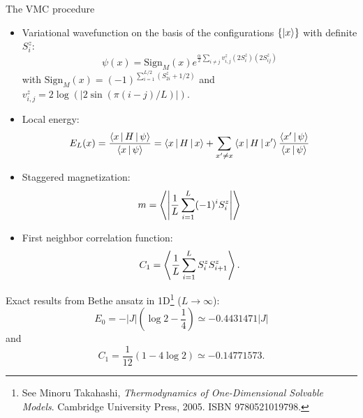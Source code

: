 \documentclass[10pt, compress, protectframetitle, handout]{beamer}
\begin{document}
\begin{frame}[allowframebreaks]{The VMC procedure}

	\begin{itemize}
		\item Variational wavefunction on the basis of the configurations $\{\Ket{x}\}$ with definite $S_{i}^{z}$:
		\begin{equation}
			\psi(x) = \text{Sign}_{M}(x)e^{\frac{\alpha}{2}\sum_{i \neq j}v_{i,j}^{z}(2S_{i}^{z})(2S_{ij}^{z})}
		\end{equation}
		with $\text{Sign}_{M}(x) = (-1)^{\sum_{i=1}^{L/2}(S_{2i}^{z}+1/2)}$ and $v_{i,j}^{z} = 2\log(|2\sin(\pi(i-j)/L)|)$.
		\item Local energy:
		\begin{equation}
			E_L(x) = \frac{\Braket{x|H|\psi}}{\Braket{x|\psi}} 
			= \Braket{x|H|x} 
			+ \sum_{x' \neq x} \Braket{x|H|x'}\frac{\Braket{x'|\psi}}{\Braket{x|\psi}} 
		\end{equation}
		\item Staggered magnetization:
		\begin{equation}
			m = \Braket{ \left\lvert \frac{1}{L}\sum_{i=1}^{L}(-1)^iS_{i}^{z} \right\rvert }
		\end{equation}
		\item First neighbor correlation function:
		\begin{equation}
			C_1 = \Braket{\frac{1}{L}\sum_{i=1}^{L}S_{i}^{z}S_{i+1}^{z}}.
		\end{equation}
	\end{itemize}
	
	Exact results from Bethe ansatz in 1D\footnote{See Minoru Takahashi, \emph{Thermodynamics of One-Dimensional Solvable Models}. Cambridge University Press, 2005. ISBN 9780521019798.} ($L \to \infty$):
	\begin{equation*}
		E_{0} = -|J|\left(\log2-\frac{1}{4}\right) \simeq -0.4431471|J|
	\end{equation*}
	and
	\begin{equation*}
		C_1 = \frac{1}{12}\left(1-4\log2\right) \simeq -0.14771573.
	\end{equation*}
	
\end{frame}
\end{document}
